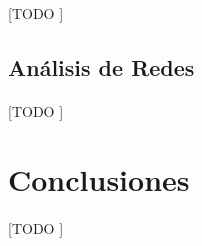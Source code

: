 \documentclass{subfiles}
\begin{document}
        \paragraph{}
        [TODO ]

      \subsection{Análisis de Redes}
      \label{sec:network_analysis}

        \paragraph{}
        [TODO ]

    \section{Conclusiones}
    \label{sec:graphs_conclusions}

      \paragraph{}
      [TODO ]
\end{document}
